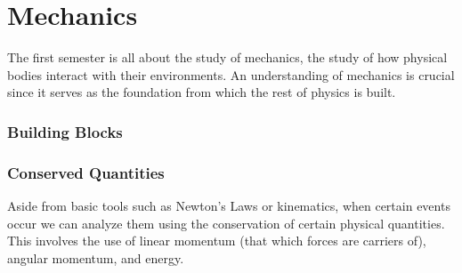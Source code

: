 \part{Mechanics}
The first semester is all about the study of mechanics, the study of how physical bodies interact with their environments. An understanding of mechanics is crucial since it serves as the foundation from which the rest of physics is built.  

\section{Building Blocks}






\section{Conserved Quantities}
Aside from basic tools such as Newton's Laws or kinematics, when certain events occur we can analyze them using the conservation of certain physical quantities. This involves the use of linear momentum (that which forces are carriers of), angular momentum, and energy.










